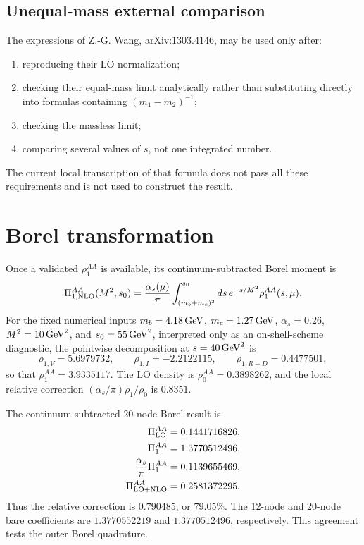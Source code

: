 \documentclass[11pt]{article}
\newcommand{\as}{\alpha_s}
\begin{document}
\subsection{Unequal-mass external comparison}

The expressions of Z.-G. Wang, arXiv:1303.4146, may be used only after:
\begin{enumerate}
 \item reproducing their LO normalization;
 \item checking their equal-mass limit analytically rather than substituting
 directly into formulas containing \((m_1-m_2)^{-1}\);
 \item checking the massless limit;
 \item comparing several values of \(s\), not one integrated number.
\end{enumerate}
The current local transcription of that formula does not pass all these
requirements and is not used to construct the result.

\section{Borel transformation}

Once a validated \(\rho_1^{AA}\) is available, its continuum-subtracted
Borel moment is
\begin{equation}
\Pi_{1,\rm NLO}^{AA}(M^2,s_0)
 =\frac{\as(\mu)}{\pi}
 \int_{(m_b+m_c)^2}^{s_0}ds\,
 e^{-s/M^2}\rho_1^{AA}(s,\mu).
\end{equation}
For the fixed numerical inputs \(m_b=4.18\,{\rm GeV}\),
\(m_c=1.27\,{\rm GeV}\), \(\as=0.26\),
\(M^2=10\,{\rm GeV}^2\), and \(s_0=55\,{\rm GeV}^2\), interpreted only as an
on-shell-scheme diagnostic, the pointwise decomposition at
\(s=40\,{\rm GeV}^2\) is
\begin{equation}
 \rho_{1,V}=5.6979732,\qquad
 \rho_{1,I}=-2.2122115,\qquad
 \rho_{1,R-D}=0.4477501,
\end{equation}
so that \(\rho_1^{AA}=3.9335117\).  The LO density is
\(\rho_0^{AA}=0.3898262\), and the local relative correction
\((\as/\pi)\rho_1/\rho_0\) is \(0.8351\).

The continuum-subtracted 20-node Borel result is
\begin{align}
 \Pi_{\rm LO}^{AA}&=0.1441716826,\\
 \Pi_{1}^{AA}&=1.3770512496,\\
 \frac{\as}{\pi}\Pi_{1}^{AA}&=0.1139655469,\\
 \Pi_{\rm LO+NLO}^{AA}&=0.2581372295.
\end{align}
Thus the relative correction is \(0.790485\), or \(79.05\%\).  The 12-node
and 20-node bare coefficients are \(1.3770552219\) and \(1.3770512496\),
respectively.  This agreement tests the outer Borel quadrature.
\end{document}
